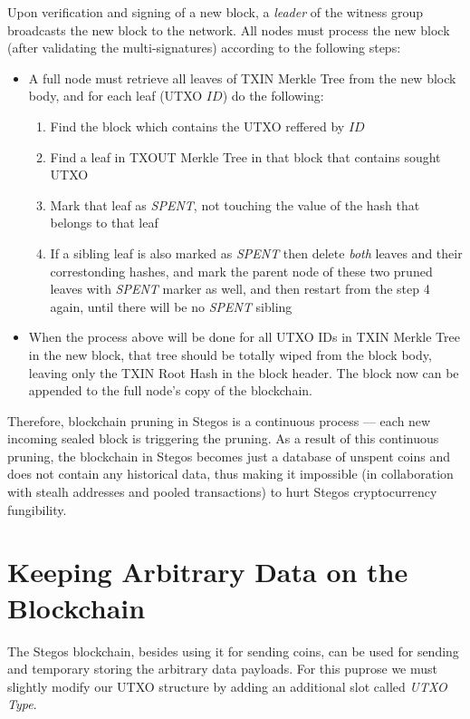 \documentclass[a4paper, 10pt, conference]{ieeeconf}
\begin{document}
Upon verification and signing of a new block, a \textit{leader} of the witness group broadcasts the new block to the network. All nodes must process the new block (after validating the multi-signatures) according to the following steps:

\begin{itemize}
	\item {A full node must retrieve all leaves of TXIN Merkle Tree from the new block body, and for each leaf (UTXO $ID$) do the following:
	\begin{enumerate}
		\item {Find the block which contains the UTXO reffered by $ID$}
		\item {Find a leaf in TXOUT Merkle Tree in that block that contains sought UTXO}
		\item {Mark that leaf as \textit{SPENT}, not touching the value of the hash that belongs to that leaf}
		\item {If a sibling leaf is also marked as \textit{SPENT} then delete \textit{both} leaves and their correstonding hashes, and mark the parent node of these two pruned leaves with \textit{SPENT} marker as well, and then restart from the step 4 again, until there will be no \textit{SPENT} sibling}
	\end{enumerate}} 
	\item {When the process above will be done for all UTXO IDs in TXIN Merkle Tree in the new block, that tree should be totally wiped from the block body, leaving only the TXIN Root Hash in the block header. The block now can be appended to the full node's copy of the blockchain.}
\end{itemize}

Therefore, blockchain pruning in Stegos is a continuous process --- each new incoming sealed block is triggering the pruning. As a result of this continuous pruning, the blockchain in Stegos becomes just a database of unspent coins and does not contain any historical data, thus making it impossible (in collaboration with stealh addresses and pooled transactions) to hurt Stegos cryptocurrency fungibility.

\section{Keeping Arbitrary Data on the Blockchain}

The Stegos blockchain, besides using it for sending coins, can be used for sending and temporary storing the arbitrary data payloads. For this puprose we must slightly modify our UTXO structure by adding an additional slot called \textit{UTXO Type}.
\end{document}

